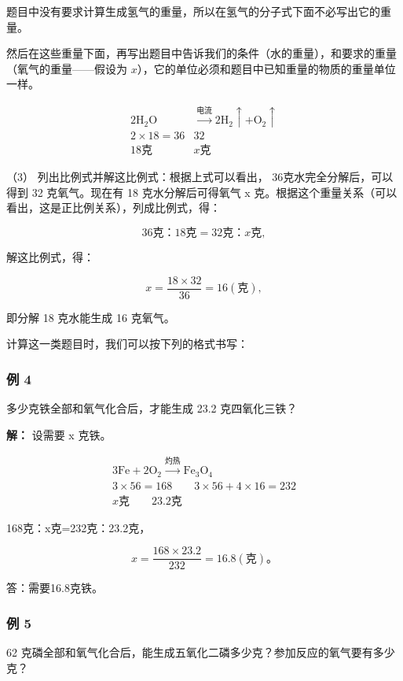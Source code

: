 题目中没有要求计算生成氢气的重量，所以在氢气的分子式下面不必写出它的重量。

然后在这些重量下面，再写出题目中告诉我们的条件（水的重量），和要求的重量（氧气的重量------假设为
\(x\)），它的单位必须和题目中已知重量的物质的重量单位一样。

\[
\begin{array}{cc}2\mathrm{H}_{2}\mathrm{O}&\xrightarrow{\text{电流}}2\mathrm{H}_{2}\uparrow+\mathrm{O}_{2}\uparrow\\2\times18=36&32\\18\text{克}&x\text{克}\end{array}
\]

（3） 列出比例式并解这比例式：根据上式可以看出，
36克水完全分解后，可以得到 32 克氧气。现在有 18 克水分解后可得氧气 x
克。根据这个重量关系（可以看出，这是正比例关系），列成比例式，得：

\[
36 \text{克}\text{：} 18 \text{克} = 32 \text{克}\text{：} x \text{克},
\]

解这比例式，得：

\[
x = \frac {18 \times 32}{36} = 16 (\text{克}),
\]

即分解 18 克水能生成 16 克氧气。

计算这一类题目时，我们可以按下列的格式书写：

\subsubsection{例 4}

多少克铁全部和氧气化合后，才能生成 23.2 克四氧化三铁？

\textbf{解：} 设需要 x 克铁。

\[
\begin{array}{l}3\mathrm{Fe}+2\mathrm{O}_{2}\xrightarrow{\text{灼热}}\mathrm{Fe}_{3}\mathrm{O}_{4}\\3\times56=168\qquad3\times56+4\times16=232\\x\text{克}\qquad23.2\text{克}\end{array}
\]

168克：x克=232克：23.2克，

\[
x = \frac {168 \times 23.2}{232} = 16.8 (\text{克})\text{。}
\]

答：需要16.8克铁。

\subsubsection{例 5}

62
克磷全部和氧气化合后，能生成五氧化二磷多少克？参加反应的氧气要有多少克？

